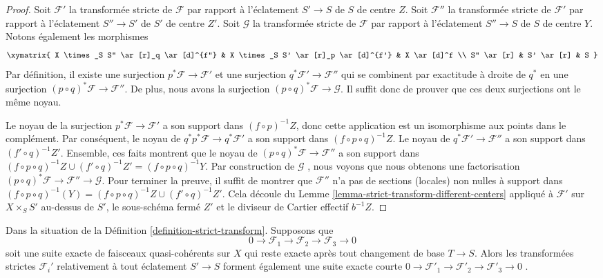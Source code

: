 \begin{proof}
Soit  $\mathcal{F}'$  la transformée stricte de  $\mathcal{F}$  par rapport à l'éclatement
 $S' \to S$  de  $S$  de centre  $Z$. Soit  $\mathcal{F}''$  la transformée
stricte de  $\mathcal{F}'$  par rapport à l'éclatement  $S'' \to S'$  de  $S'$  de centre
 $Z'$. Soit  $\mathcal{G}$  la transformée stricte de  $\mathcal{F}$  par rapport
à l'éclatement  $S'' \to S$  de  $S$  de centre  $Y$. Notons
également les morphismes
$$
\xymatrix{
X \times_S S'' \ar[r]_q \ar[d]^{f''} &
X \times_S S' \ar[r]_p \ar[d]^{f'} &
X \ar[d]^f \\
S'' \ar[r] & S' \ar[r] & S
}
$$
Par définition, il existe une surjection  $p^*\mathcal{F} \to \mathcal{F}'$  et une surjection
 $q^*\mathcal{F}' \to \mathcal{F}''$  qui se combinent par exactitude à droite de  $q^*$  en une
surjection  $(p \circ q)^*\mathcal{F} \to \mathcal{F}''$. De plus, nous avons la surjection  $(p \circ q)^*\mathcal{F} \to \mathcal{G}$. Il suffit
donc de prouver que ces deux surjections ont le même noyau.

\medskip\noindent
Le noyau de la surjection  $p^*\mathcal{F} \to \mathcal{F}'$  a son support dans  $(f \circ p)^{-1}Z$, donc cette
application est un isomorphisme aux points dans le complément. Par conséquent, le
noyau de  $q^*p^*\mathcal{F} \to q^*\mathcal{F}'$  a son support dans  $(f \circ p \circ q)^{-1}Z$. Le noyau de  $q^*\mathcal{F}' \to \mathcal{F}''$  a
son support dans  $(f' \circ q)^{-1}Z'$. Ensemble, ces faits montrent que le noyau de  $(p \circ q)^*\mathcal{F} \to \mathcal{F}''$  a
son support dans  $(f \circ p \circ q)^{-1}Z \cup (f' \circ q)^{-1}Z' =
(f \circ p \circ q)^{-1}Y$. Par construction de  $\mathcal{G}$ , nous voyons que nous
obtenons une factorisation  $(p \circ q)^*\mathcal{F} \to \mathcal{F}'' \to \mathcal{G}$. Pour terminer la preuve, il suffit de
montrer que  $\mathcal{F}''$  n’a pas de sections (locales) non nulles à support dans
 $(f \circ p \circ q)^{-1}(Y) =
(f \circ p \circ q)^{-1}Z \cup (f' \circ q)^{-1}Z'$. Cela découle du Lemme  \ref{lemma-strict-transform-different-centers}  appliqué à  $\mathcal{F}'$  sur
 $X \times_S S'$  au-dessus de  $S'$, le sous-schéma fermé  $Z'$  et le
diviseur de Cartier effectif  $b^{-1}Z$.
\end{proof}

\begin{lemma}
\label{lemma-strict-transform-universally-injective}
Dans la situation de la Définition  \ref{definition-strict-transform}. Supposons que
$$
0 \to \mathcal{F}_1 \to \mathcal{F}_2 \to \mathcal{F}_3 \to 0
$$
soit une suite exacte de faisceaux quasi-cohérents sur  $X$  qui reste
exacte après tout changement de base  $T \to S$. Alors les transformées strictes
$\mathcal{F}_i'$  relativement à tout éclatement  $S' \to S$  forment également une
suite exacte courte  $0 \to \mathcal{F}'_1 \to \mathcal{F}'_2 \to \mathcal{F}'_3 \to 0$ .
\end{lemma}

